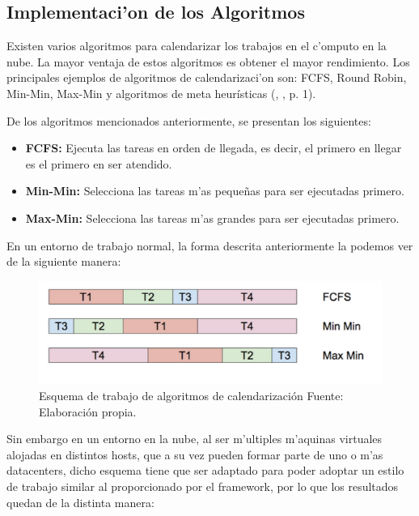 \subsection{Implementaci'on de los Algoritmos}

Existen varios algoritmos para calendarizar los trabajos en el c'omputo en la nube. La mayor ventaja de estos algoritmos es obtener el mayor rendimiento. Los principales ejemplos de algoritmos de calendarizaci'on son: FCFS, Round Robin, Min-Min, Max-Min y algoritmos de meta heurísticas  (\citeauthor{shimpy2014different}, \citeyear{shimpy2014different}, p. 1).



De los algoritmos mencionados anteriormente, se presentan los siguientes:


\begin{itemize}
	\item  \textbf{FCFS:} Ejecuta las tareas en orden de llegada, es decir, el primero en llegar es el primero en ser atendido.
	\item  \textbf{Min-Min:} Selecciona las tareas m'as pequeñas para ser ejecutadas primero.
	\item  \textbf{Max-Min:} Selecciona las tareas m'as grandes para ser ejecutadas primero.
\end{itemize}

En un entorno de trabajo normal, la forma descrita anteriormente la podemos ver de la siguiente manera:

\begin{figure}
	\caption{Esquema de trabajo de algoritmos de calendarización
		Fuente: Elaboración propia.}
	\centering
	\includegraphics[scale=0.5]{media/imagendos}
\end{figure}


\newpage
Sin embargo en un entorno en la nube, al ser m'ultiples m'aquinas virtuales alojadas en distintos hosts, que a su vez pueden formar parte de uno o m'as datacenters, dicho esquema tiene que ser adaptado para poder adoptar un estilo de trabajo similar al proporcionado por el framework, por lo que los resultados quedan de la distinta manera:

